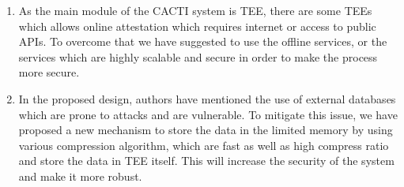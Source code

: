 \documentclass[runningheads,10pt]{llncs}
\begin{document}
\begin{enumerate}
		\item As the main module of the CACTI \cite{ourpaper} system is TEE, there are some TEEs which allows online attestation which requires internet or access to public APIs. To overcome that we have suggested to use the offline services, or the services which are highly scalable and secure in order to make the process more secure.

		\item In the proposed design, authors have mentioned the use of external databases which are prone to attacks and are vulnerable. To mitigate this issue, we have proposed a new mechanism to store the data in the limited memory by using various compression algorithm, which are fast as well as high compress ratio and store the data in TEE itself. This will increase the security of the system and make it more robust.

	\end{enumerate}

\end{document}

